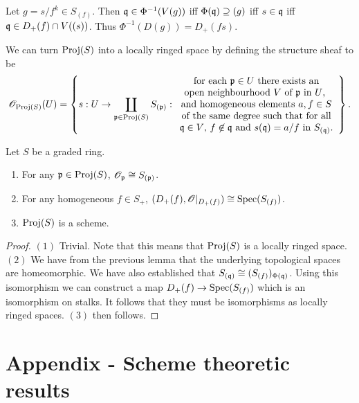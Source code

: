 \documentclass{memoir}
\begin{document}
\begin{remark}
    Let $g = s/f^k\in S_{(f)}$.
    Then $\mathfrak{q}\in \Phi^{-1}(V(g))$ iff $\Phi(\mathfrak{q})\supseteq (g)$ iff $s\in \mathfrak{q}$ iff $\mathfrak{q}\in D_+(f)\cap V((s))$.
    Thus $\Phi^{-1}(D(g)) = D_+(fs)$.
\end{remark}
\begin{definition}
    We can turn $\operatorname{Proj}(S)$ into a locally ringed space by defining the structure sheaf to be
    \begin{equation}
        \mathscr{O}_{\operatorname{Proj}(S)}(U) = \left\{s:U\to\coprod_{\mathfrak{p}\in \operatorname{Proj}(S)}S_{(\mathfrak{p})}:\begin{array}{c} \text{for each $\mathfrak{p}\in U$ there exists an} \\ \text{open neighbourhood $V$ of $\mathfrak{p}$ in $U$, }\\ \text{and homogeneous elements $a,f\in S$} \\ \text{of the same degree such that for all} \\ \text{$\mathfrak{q}\in V$, $f\not\in \mathfrak{q}$ and $s(\mathfrak{q}) = a/f$ in $S_{(\mathfrak{q})}$.}\end{array}\right\}.
    \end{equation}
\end{definition}
\begin{thm}
    Let $S$ be a graded ring.
    \begin{enumerate}
        \item For any $\mathfrak{p}\in \operatorname{Proj}(S)$, $\mathscr{O}_{\mathfrak{p}}\cong S_{(\mathfrak{p})}$.
        \item For any homogeneous $f\in S_+$, $(D_+(f),\mathscr{O}|_{D_+(f)}) \cong \operatorname{Spec}(S_{(f)})$.
        \item $\operatorname{Proj}(S)$ is a scheme.
    \end{enumerate}
\end{thm}
\begin{proof}
    $(1)$ Trivial. Note that this means that $\operatorname{Proj}(S)$ is a locally ringed space.
    $(2)$ We have from the previous lemma that the underlying topological spaces are homeomorphic.
    We have also established that $S_{(\mathfrak{q})}\cong (S_{(f)})_{\Phi(\mathfrak{q})}$.
    Using this isomorphism we can construct a map $D_+(f)\to \operatorname{Spec}(S_{(f)})$ which is an isomorphism on stalks.
    It follows that they must be isomorphisms as locally ringed spaces.
    $(3)$ then follows.
\end{proof}
\chapter{Appendix - Scheme theoretic results}
\end{document}
